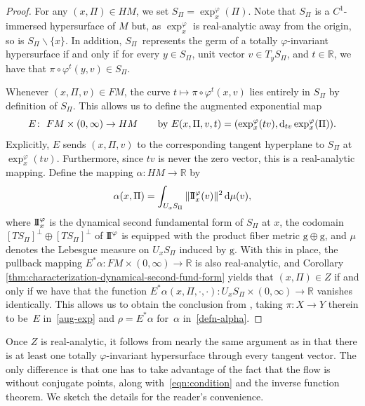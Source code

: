 \documentclass[10pt,a4paper]{amsart}
\newcommand{\g}{\mathrm{g}}
\newcommand{\R}{\mathbb{R}}
\numberwithin{equation}{section}
\theoremstyle{definition}
\begin{document}
\begin{proof}
 For any $(x, \Pi) \in HM$, we set $S_\Pi=\exp_x^{\varphi}(\Pi)$. Note that $S_\Pi$ is a $C^1$-immersed hypersurface of $M$ but, as $\exp_x^{\varphi}$ is real-analytic away from the origin, so is $S_\Pi \smallsetminus \{x\}$. In addition, $S_\Pi$~represents the germ of a totally \mbox{$\varphi$-in\-va\-ri\-ant} hypersurface if and only if for every $y \in S_\Pi$, unit vector $v \in T_y S_\Pi$, and $t \in \R$, we have that $\pi \circ \varphi^t(y,v) \in S_\Pi$.

 Whenever $(x, \Pi, v) \in FM$, the curve $t\mapsto \pi\circ \varphi^t(x,v)$ lies entirely in $S_\Pi$ by definition of $S_\Pi$. This allows us to define the augmented exponential map
 \begin{equation}\label{aug-exp} E \colon \ FM \times (0,\infty) \rightarrow HM \qquad \mbox{by } E(x, \Pi, v, t) = (\exp^\varphi_x(tv), {\rm d}_{tv}\exp_x^{\varphi}(\Pi)).\end{equation}
 Explicitly, $E$ sends $(x, \Pi, v)$ to the corresponding tangent hyperplane to $S_\Pi$ at $\exp_x^{\varphi}(tv)$. Furthermore, since $tv$ is never the zero vector, this is a real-analytic mapping. Define the mapping $\alpha\colon HM \to \mathbb{R}$ by
 \begin{equation}\label{defn-alpha}
 \alpha(x,\Pi) = \int_{U_xS_\Pi} \|{\rm I\!I}^\varphi_x(v)\|^2\,{\rm d}\mu(v),
 \end{equation}
 where ${\rm I\!I}_x^\varphi$ is the dynamical second fundamental form of $S_\Pi$ at $x$, the codomain $[TS_\Pi]^\perp \oplus [TS_\Pi]^\perp$ of ${\rm I\!I}^\varphi$ is equipped with the product fiber metric $\g\oplus \g$, and $\mu$ denotes the Lebesgue measure on $U_xS_\Pi$ induced by $\g$. With this in place, the pullback mapping $E^*\alpha \colon FM \times (0,\infty) \rightarrow \mathbb{R}$ is also real-analytic, and Corollary \ref{thm:characterization-dynamical-second-fund-form} yields that $(x,\Pi) \in Z$ if and only if we have that the function $E^*\alpha(x, \Pi, \cdot, \cdot) \colon U_xS_\Pi \times (0,\infty) \rightarrow \mathbb{R}$ vanishes identically. This allows us to obtain the conclusion from \cite[Lemma 3.2.2]{filip2024finiteness}, taking $\pi\colon X\to Y$ therein to be~$E$ in~\eqref{aug-exp} and $\rho = E^*\alpha$ for~$\alpha$ in~\eqref{defn-alpha}.
\end{proof}

Once $Z$ is real-analytic, it follows from nearly the same argument as in \cite[Proposition~3.2.5]{filip2024finiteness} that there is at least one totally $\varphi$-invariant hypersurface through every tangent vector. The only difference is that one has to take advantage of the fact that the flow is without conjugate points, along with~\eqref{eqn:condition} and the inverse function theorem.
We sketch the details for the reader's convenience.
\end{document}
